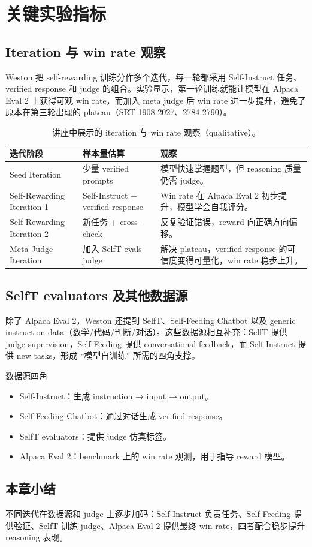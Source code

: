 \section{关键实验指标}
\subsection{Iteration 与 win rate 观察}
Weston 把 self-rewarding 训练分作多个迭代，每一轮都采用 Self-Instruct 任务、verified response 和 judge 的组合。实验显示，第一轮训练就能让模型在 Alpaca Eval 2 上获得可观 win rate，而加入 meta judge 后 win rate 进一步提升，避免了原本在第三轮出现的 plateau（SRT 1908-2027、2784-2790）。

\begin{table}[H]
\centering
\begin{tabular}{p{4cm}p{4cm}p{7cm}}
\toprule
迭代阶段 & 样本量估算 & 观察 \\
\midrule
Seed Iteration & 少量 verified prompts & 模型快速掌握题型，但 reasoning 质量仍需 judge。 \\
Self-Rewarding Iteration 1 & Self-Instruct + verified response & Win rate 在 Alpaca Eval 2 初步提升，模型学会自我评分。 \\
Self-Rewarding Iteration 2 & 新任务 + cross-check & 反复验证错误，reward 向正确方向偏移。 \\
Meta-Judge Iteration & 加入 SelfT evals judge & 解决 plateau，verified response 的可信度变得可量化，win rate 稳步上升。 \\
\bottomrule
\end{tabular}
\caption{讲座中展示的 iteration 与 win rate 观察（qualitative）。}
\end{table}

\subsection{SelfT evaluators 及其他数据源}
除了 Alpaca Eval 2，Weston 还提到 SelfT、Self-Feeding Chatbot 以及 generic instruction data（数学/代码/判断/对话）。这些数据源相互补充：SelfT 提供 judge supervision，Self-Feeding 提供 conversational feedback，而 Self-Instruct 提供 new tasks，形成 ``模型自训练'' 所需的四角支撑。

\begin{importantbox}{数据源四角}
\begin{itemize}
    \item Self-Instruct：生成 instruction → input → output。
    \item Self-Feeding Chatbot：通过对话生成 verified response。
    \item SelfT evaluators：提供 judge 仿真标签。
    \item Alpaca Eval 2：benchmark 上的 win rate 观测，用于指导 reward 模型。
\end{itemize}
\end{importantbox}

\subsection{本章小结}
不同迭代在数据源和 judge 上逐步加码：Self-Instruct 负责任务、Self-Feeding 提供验证、SelfT 训练 judge、Alpaca Eval 2 提供最终 win rate，四者配合稳步提升 reasoning 表现。


